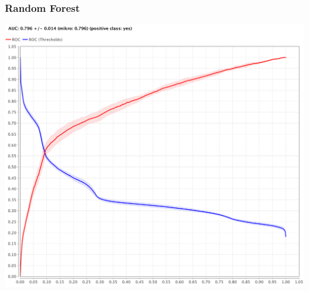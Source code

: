 \documentclass{beamer}
\begin{document}
\begin{frame}
	\frametitle{Random Forest}
  \includegraphics[width=\textwidth,height=\textheight,keepaspectratio]{rand-forest-roc}
\end{frame}

\end{document}
